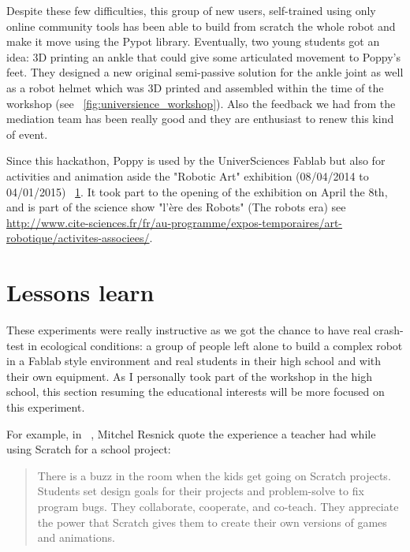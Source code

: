 Despite these few difficulties, this group of new users, self-trained using only online community tools has been able to build from scratch the whole robot and make it move using the Pypot library. Eventually, two young students got an idea: 3D printing an ankle that could give some articulated movement to Poppy's feet. They designed a new original semi-passive solution for the ankle joint as well as a robot helmet which was 3D printed and assembled within the time of the workshop (see \figurename~\ref{fig:universience_workshop}). Also the feedback we had from the mediation team has been really good and they are enthusiast to renew this kind of event.


\begin{figure}[!ht]
\centering
    \hfil
    \caption{}
    \label{fig:universcience_art}
\end{figure}

Since this hackathon, Poppy is used by the UniverSciences Fablab but also for activities and animation aside the "Robotic Art" exhibition (08/04/2014 to 04/01/2015) \figurename~\ref{fig:universcience_art}. It took part to the opening of the exhibition on April the 8th, and is part of the science show "l'ère des Robots" (The robots era) see \url{http://www.cite-sciences.fr/fr/au-programme/expos-temporaires/art-robotique/activites-associees/}.



\section{Lessons learn} %

These experiments were really instructive as we got the chance to have real crash-test in ecological conditions: a group of people left alone to build a complex robot in a Fablab style environment and real students in their high school and with their own equipment. As I personally took part of the workshop in the high school, this section resuming the educational interests will be more focused on this experiment.

For example, in ~\cite{resnick2008sowing}, Mitchel Resnick quote the experience a teacher had while using Scratch for a school project:
\begin{quotation}
    There is a buzz in the room when the kids get going on Scratch projects. Students set design goals for their projects and problem-solve to fix program bugs. They collaborate, cooperate, and co-teach. They appreciate the power that Scratch gives them to create their own versions of games and animations.

\end{quotation}

